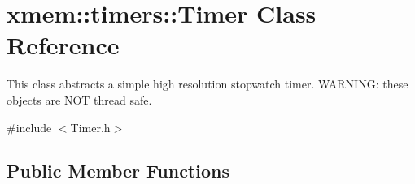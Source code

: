 \hypertarget{classxmem_1_1timers_1_1_timer}{}\section{xmem\+:\+:timers\+:\+:Timer Class Reference}
\label{classxmem_1_1timers_1_1_timer}


This class abstracts a simple high resolution stopwatch timer. W\+A\+R\+N\+I\+N\+G\+: these objects are N\+O\+T thread safe.  




{\ttfamily \#include $<$Timer.\+h$>$}

\subsection*{Public Member Functions}
